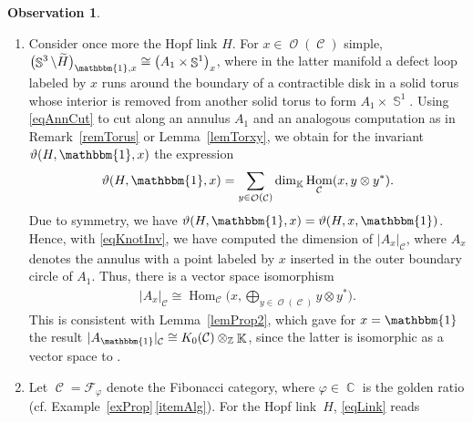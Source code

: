 \documentclass[10pt,a4paper]{amsart}
\DeclareMathOperator{\Hom}{Hom}
\DeclareMathOperator{\K}{\mathbb{K}}
\DeclareMathOperator{\C}{\mathbb{C}}
\DeclareMathOperator{\Sp}{\mathbb{S}}
\DeclareMathOperator{\calc}{\mathcal{C}}
\DeclareMathOperator{\calo}{\mathcal{O}}
\numberwithin{equation}{section}
\theoremstyle{definition}
\newtheorem{Observation}[Observation]{Observation}
\begin{document}
\begin{Observation}
\begin{enumerate}
 \begin{align}
 & \sum_{x_1, \dots, x_{|L|} \in \calo(\calc)}\prod_{j= 1}^{|L|} \dim(x_j) \, \vartheta(L, x_1, \dots, x_{|L|}) \nonumber\\
 &\qquad \overset{\rm \ref{P2}}{=} \Biggl|\Sp^3\setminus \bigsqcup_{j = 1}^{|L|}\bigl(B^3\bigr)^{\circ}\Biggr|_{\mathcal{C}} \overset{\rm \ref{P1}}{=} \dim(\calc)^{|L|-1}.\label{eqLink}
 \end{align}
 Indeed, this expression only depends on the number of components of the link. For example, for two (tame) knots $K$, $K'$, we have \[
 \sum_{x \in \calo(\calc)}\dim(x) \vartheta(K, x) = \sum_{x \in \calo(\calc)}\dim(x) \vartheta(K', x).
 \]
 \item Consider once more the Hopf link $H$. For $x \in \calo(\calc)$ simple, $\bigl(\Sp^3\setminus \widetilde{H}\bigr)_{\mathbbm{1}, x} \cong \bigl(A_1 \times \Sp^1\bigr)_x$, where in the latter manifold a defect loop labeled by $x$ runs around the boundary of a contractible disk in a solid torus whose interior is removed from another solid torus to form $A_1 \times \Sp^1$. Using \eqref{eqAnnCut} to cut along an annulus $A_1$ and an analogous computation as in Remark~\ref{remTorus} or Lemma~\ref{lemTorxy}, we obtain for the invariant $\vartheta(H, \mathbbm{1}, x)$ the expression
 \begin{align}
 \label{eqKnotInv}
 \vartheta(H, \mathbbm{1}, x) = \sum_{y \in \calo(\calc)} \dim_{\K}\Hom_{\calc}(x, y \otimes y^*).
 \end{align}
 Due to symmetry, we have $\vartheta(H, \mathbbm{1}, x) = \vartheta(H, x, \mathbbm{1})$. Hence, with \eqref{eqKnotInv}, we have computed the dimension of $|A_x|_{\calc}$, where $A_x$ denotes the annulus with a point labeled by $x$ inserted in the outer boundary circle of $A_1$. Thus, there is a vector space isomorphism
 \begin{align*}
 |A_x|_{\calc} \cong \Hom_{\calc}\biggl(x, \bigoplus_{y \in \calo(\calc)}y \otimes y^*\biggr).
 \end{align*}
 This is consistent with Lemma~\ref{lemProp2}, which gave for $x = \mathbbm{1}$ the result $|A_{\mathbbm{1}}|_{\calc} \cong K_0(\mathcal{C}) \otimes_{\mathbb{Z}} \K$, since the latter is isomorphic as a vector space to \smash{$\Hom_{\calc}\bigl(\mathbbm{1}, \bigoplus_{y \in \calo(\calc)}y \otimes y^*\bigr)$}.
 \item \label{obsEx} Let $\calc = \mathcal{F}_{\varphi}$ denote the Fibonacci category, where $\varphi \in \C$ is the golden ratio (cf. Example~\ref{exProp}\,\ref{itemAlg}). For the Hopf link~$H$, \eqref{eqLink} reads

\end{enumerate}
\end{Observation}
\end{document}
